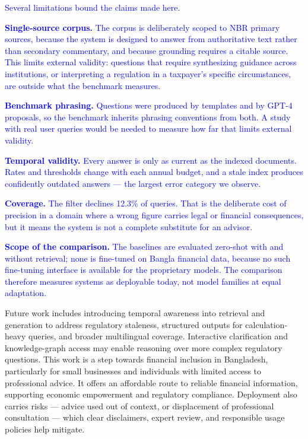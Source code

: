 \documentclass{article}
\newcommand{\revised}[1]{\textcolor{blue}{#1}}
\newcommand{\revised}[1]{#1}
\begin{document}
\revised{Several limitations bound the claims made here.}

\revised{\textbf{Single-source corpus.} The corpus is deliberately scoped to NBR primary
sources, because the system is designed to answer from authoritative text rather than
secondary commentary, and because grounding requires a citable source. This limits
external validity: questions that require synthesizing guidance across institutions, or
interpreting a regulation in a taxpayer's specific circumstances, are outside what the
benchmark measures.}

\revised{\textbf{Benchmark phrasing.} Questions were produced by templates and by GPT-4
proposals, so the benchmark inherits phrasing conventions from both. A study with real
user queries would be needed to measure how far that limits external validity.}

\revised{\textbf{Temporal validity.} Every answer is only as current as the indexed
documents. Rates and thresholds change with each annual budget, and a stale index
produces confidently outdated answers --- the largest error category we observe.}

\revised{\textbf{Coverage.} The filter declines 12.3\% of queries. That is the
deliberate cost of precision in a domain where a wrong figure carries legal or financial
consequences, but it means the system is not a complete substitute for an advisor.}

\revised{\textbf{Scope of the comparison.} The baselines are evaluated zero-shot with
and without retrieval; none is fine-tuned on Bangla financial data, because no such
fine-tuning interface is available for the proprietary models. The comparison therefore
measures systems as deployable today, not model families at equal adaptation.}

Future work includes introducing temporal awareness into retrieval and generation to
address regulatory staleness, structured outputs for calculation-heavy queries, and
broader multilingual coverage. Interactive clarification and knowledge-graph access may
enable reasoning over more complex regulatory questions. This work is a step towards
financial inclusion in Bangladesh, particularly for small businesses and individuals
with limited access to professional advice. It offers an affordable route to reliable
financial information, supporting economic empowerment and regulatory compliance.
Deployment also carries risks --- advice used out of context, or displacement of
professional consultation --- which clear disclaimers, expert review, and responsible
usage policies help mitigate.
\end{document}
